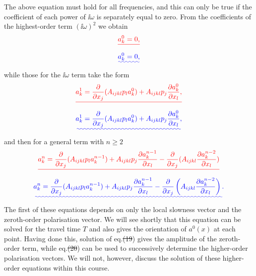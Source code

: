 \documentclass [a4paper,12pt]{paper}
\providecommand{\DIFadd}[1]{{\protect\color{blue}\uwave{#1}}} %
\providecommand{\DIFdel}[1]{{\protect\color{red}\sout{#1}}}                      %
\providecommand{\DIFaddbegin}{} %
\providecommand{\DIFaddend}{} %
\providecommand{\DIFdelbegin}{} %
\providecommand{\DIFdelend}{} %
\begin{document}
The above equation must hold for all frequencies, and this can only be true if the coefficient of each power of $\ii\omega$ is separately equal to zero. From the coefficients of the highest-order term $(\ii\omega)^{2}$ we obtain
\DIFdelbegin \begin{displaymath}
[\DIFdel{A_{ijkl}p_{j}p_{l}-\rho\delta_{ik}}]\DIFdel{a_{k}^{0}=0,
}\end{displaymath}%
\DIFdelend \DIFaddbegin \begin{equation}
[\DIFadd{A_{ijkl}p_{j}p_{l}-\rho\delta_{ik}}]\DIFadd{a_{k}^{0}=0,
\label{eq:18}
}\end{equation}\DIFaddend 
while those for the $\ii\omega$ term take the form
\DIFdelbegin \begin{displaymath}
[\DIFdel{A_{ijkl}p_{j}p_{l}-\rho\delta_{ik}}]\DIFdel{a_{k}^{1}=\frac{\partial}{\partial x_{j}}(A_{ijkl}p_{l}a_{k}^{0})+A_{ijkl}p_{j}\frac{\partial a_{k}^{0}}{\partial x_{l}},
}\end{displaymath}%
\DIFdelend \DIFaddbegin \begin{equation}
[\DIFadd{A_{ijkl}p_{j}p_{l}-\rho\delta_{ik}}]\DIFadd{a_{k}^{1}=\frac{\partial}{\partial x_{j}}(A_{ijkl}p_{l}a_{k}^{0})+A_{ijkl}p_{j}\frac{\partial a_{k}^{0}}{\partial x_{l}},
\label{eq:19}
}\end{equation}\DIFaddend 
and then for a general term with $n\ge2$
\DIFdelbegin \begin{displaymath}
[\DIFdel{A_{ijkl}p_{j}p_{l}-\rho\delta_{ik}}]\DIFdel{a_{k}^{n}=\frac{\partial}{\partial x_{j}}(A_{ijkl}p_{l}a_{k}^{n-1})+A_{ijkl}p_{j}\frac{\partial a_{k}^{n-1}}{\partial x_{l}}-\frac{\partial}{\partial x_{j}}(A_{ijkl}\frac{\partial a_{k}^{n-2}}{\partial x_{l}})
}\end{displaymath}%
\DIFdelend \DIFaddbegin \begin{equation}
[\DIFadd{A_{ijkl}p_{j}p_{l}-\rho\delta_{ik}}]\DIFadd{a_{k}^{n}=\frac{\partial}{\partial x_{j}}(A_{ijkl}p_{l}a_{k}^{n-1})+A_{ijkl}p_{j}\frac{\partial a_{k}^{n-1}}{\partial x_{l}}-\frac{\partial}{\partial x_{j}}\left(A_{ijkl}\frac{\partial a_{k}^{n-2}}{\partial x_{l}}\right).
\label{eq:20}
}\end{equation}\DIFaddend 
The first of these equations depends on only the local slowness vector and the zeroth-order polarisation vector. We will see shortly that 
this equation can be solved for the travel time $T$ and also gives the orientation of \DIFdelbegin \DIFdel{$a^{0}(x)$ }\DIFdelend \DIFaddbegin \DIFadd{$\mathbf{a}^{0}(\mathbf{x})$ }\DIFaddend at each point. 
Having done this, solution of eq.\DIFdelbegin \DIFdel{(19}\DIFdelend \DIFaddbegin \DIFadd{~(\ref{eq:19}}\DIFaddend ) gives the amplitude of the zeroth-order term, while eq.\DIFdelbegin \DIFdel{(20}\DIFdelend \DIFaddbegin \DIFadd{~(\ref{eq:20}}\DIFaddend ) can be used to successively 
determine the higher-order polarisation vectors. We will not, however, discuss the solution of these higher-order equations
 within this course.
\end{document}
